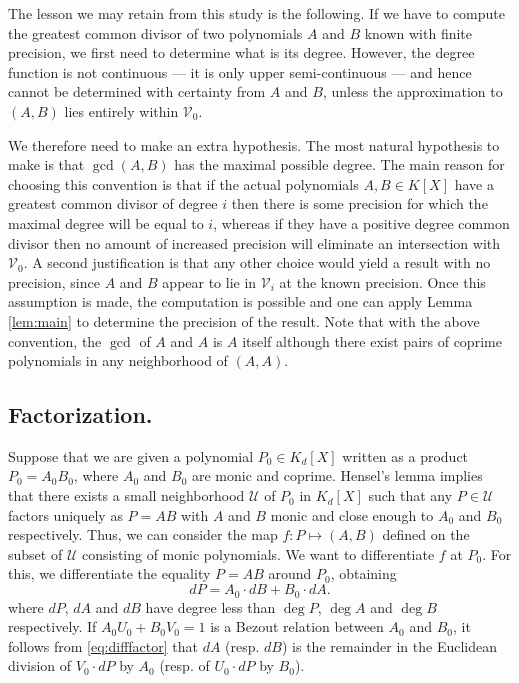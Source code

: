 \documentclass{sig-alternate}
\begin{document}
{\medskip

The lesson we may retain from this study is the following. If we have to 
compute the greatest common divisor of two polynomials $A$ and $B$ known 
with finite precision, we first need to determine what is its degree. 
However, the degree function is not continuous --- it is only upper 
semi-continuous --- and hence cannot be determined with certainty from $A$ and 
$B$, unless the approximation to $(A,B)$ lies entirely within $\mathcal V_0$.

We therefore need to make an extra hypothesis.  The most natural hypothesis to make
is that $\gcd(A, B)$ has the maximal possible degree.  The main reason for choosing
this convention is that if the actual polynomials $A, B \in K[X]$ have a greatest common
divisor of degree $i$ then there is some precision for which the maximal degree will be
equal to $i$, whereas if they have a positive
degree common divisor then no amount of increased precision will eliminate an intersection
with $\mathcal V_0$.  A second justification is that any other choice would yield a result
with no precision, since $A$ and $B$ appear to lie in $\mathcal V_i$ at the known precision.
Once this assumption is made, the computation is possible and one can apply Lemma 
\ref{lem:main} to determine the precision of the result.
Note that with the above convention, the $\gcd$ of $A$ and $A$ is $A$ 
itself although there exist pairs of coprime polynomials in any 
neighborhood of $(A,A)$.

\subsection*{Factorization.}

Suppose that we are given a polynomial $P_0 \in K_d[X]$ written as a 
product $P_0 = A_0 B_0$, where $A_0$ and $B_0$ are monic and coprime. 
Hensel's lemma implies that there exists a small neighborhood $\mathcal 
U$ of $P_0$ in $K_d[X]$ such that any $P \in \mathcal U$ factors 
uniquely as $P = A B$ with $A$ and $B$ monic and close enough to $A_0$ 
and $B_0$ respectively. Thus, we can consider the map $f : P 
\mapsto (A,B)$ defined on the subset of $\mathcal U$ consisting of monic 
polynomials. We want to differentiate $f$ at $P_0$. For this, we 
differentiate the equality $P = A B$ around $P_0$, obtaining
\begin{equation}
\label{eq:difffactor}
dP = A_0 \cdot dB + B_0 \cdot dA.
\end{equation}
where $dP$, $dA$ and $dB$ have degree less than $\deg P$, $\deg A$ and 
$\deg B$ respectively. If $A_0 U_0 + B_0 V_0 = 1$ is a Bezout relation
between $A_0$ and $B_0$, it follows from \eqref{eq:difffactor} that
$dA$ (resp. $dB$) is the remainder in the Euclidean division of $V_0
{\cdot} dP$ by $A_0$ (resp. of $U_0 {\cdot} dP$ by $B_0$).

}
\end{document}
